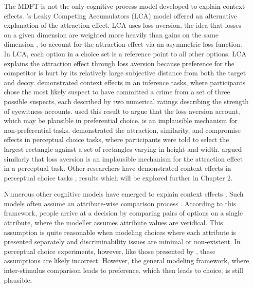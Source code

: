The MDFT is not the only cognitive process model developed to explain context effects. \textcite{usherLossAversionInhibition2004a}'s Leaky Competing Accumulators (LCA) model offered an alternative explanation of the attraction effect. LCA uses loss aversion, the idea that losses on a given dimension are weighted more heavily than gains on the same dimension \parencite{tverskyAdvancesProspectTheorya,kahnemanProspectTheoryAnalysis1979}, to account for the attraction effect via an asymmetric loss function. In LCA, each option in a choice set is a reference point to all other options. LCA explains the attraction effect through loss aversion because preference for the competitor is hurt by its relatively large subjective distance from both the target and decoy. \textcite{truebloodMultialternativeContextEffects2012} demonstrated context effects in an inference tasks, where participants chose the most likely suspect to have committed a crime from a set of three possible suspects, each described by two numerical ratings describing the strength of eyewitness accounts. \textcite{truebloodMultialternativeContextEffects2012} used this result to argue that the loss aversion account, which may be plausible in preferential choice, is an implausible mechanism for non-preferential tasks. \textcite{trueblood2013not} demonstrated the attraction, similarity, and compromise effects in perceptual choice tasks, where participants were told to select the largest rectangle against a set of rectangles varying in height and width. \textcite{trueblood2013not} argued similarly that loss aversion is an implausible mechanism for the attraction effect in a perceptual task. Other researchers have demonstrated context effects in perceptual choice tasks \parencite{choplinComparisoninducedDecoyEffects2005b,yearsleyContextEffectsSimilarity2022,liaoInfluenceDistanceDecoy2021,spektorWhenGoodLooks2018b,spektorRepulsionEffectPreferential2022}, results which will be explored further in Chapter 2. 

Numerous other cognitive models have emerged to explain context effects \parencite{bhatiaAssociationsAccumulationPreference2013b,noguchiMultialternativeDecisionSampling2018a,trueblood2014multiattribute,wollschlager2NaryChoiceTree2012a,bergnerVAMPVotingAgent2019b,spektor2019similarity}. Such models often assume an attribute-wise comparison process \parencite{roeMultialternativeDecisionField2001a,trueblood2013not,usherLossAversionInhibition2004a,bhatiaAssociationsAccumulationPreference2013b}. According to this framework, people arrive at a decision by comparing pairs of options on a single attribute, where the modeller assumes attribute values are veridical. This assumption is quite reasonable when modeling choices where each attribute is presented separately and discriminability issues are minimal or non-existent. In perceptual choice experiments, however, like those presented by \textcite{trueblood2013not}, these assumptions are likely incorrect. However, the general modeling framework, where inter-stimulus comparison leads to preference, which then leads to choice, is still plausible. 

